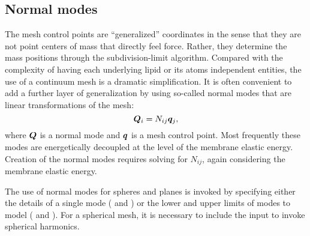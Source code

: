 \subsection{Normal modes}

The mesh control points are ``generalized'' coordinates in the sense that they are not point centers of mass that directly feel force.
Rather, they determine the mass positions through the subdivision-limit algorithm.
Compared with the complexity of having each underlying lipid or its atoms independent entities, the use of a continuum mesh is a dramatic simplification.
It is often convenient to add a further layer of generalization by using so-called normal modes that are linear transformations of the mesh:
\begin{equation}
\boldsymbol{Q}_i = N_{ij} \boldsymbol{q}_j,  
\end{equation}
where $\boldsymbol{Q}$ is a normal mode and $\boldsymbol{q}$ is a mesh control point. 
Most frequently these modes are energetically decoupled at the level of the membrane elastic energy.
Creation of the normal modes requires solving for $N_{ij}$, again considering the membrane elastic energy.

The use of normal modes for spheres and planes is invoked by specifying either 
the details of a single mode ( and ) or the lower and upper limits of modes to model ( and ).  
For a spherical mesh, it is necessary to include the input  to invoke spherical harmonics. 
